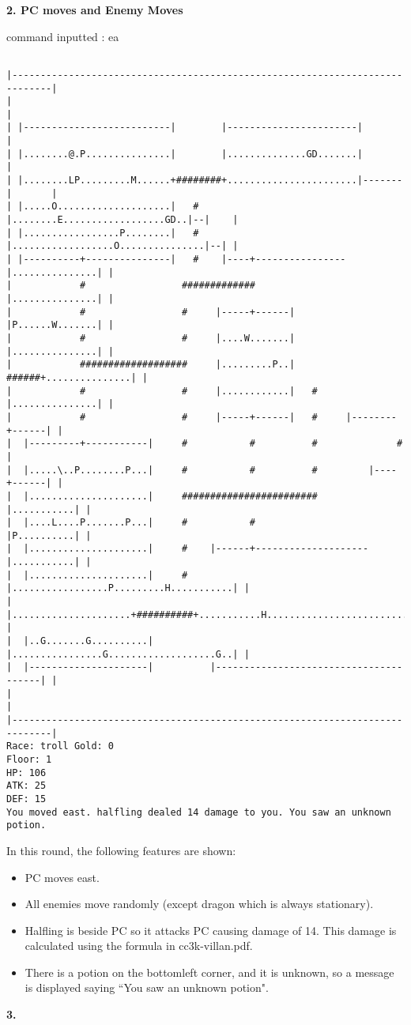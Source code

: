 \documentclass[11pt]{article}
\theoremstyle{plain}
\begin{document}
\newpage
\textbf{2. PC moves and Enemy Moves}

command inputted : ea
\begin{Verbatim}[fontsize=\small]

|-----------------------------------------------------------------------------|
|                                                                             |
| |--------------------------|        |-----------------------|               |
| |........@.P...............|        |..............GD.......|               |
| |........LP.........M......+########+.......................|-------|       |
| |.....O....................|   #    |........E..................GD..|--|    |
| |.................P........|   #    |..................O...............|--| |
| |----------+---------------|   #    |----+----------------|...............| |
|            #                 #############                |...............| |
|            #                 #     |-----+------|         |P......W.......| |
|            #                 #     |....W.......|         |...............| |
|            ###################     |.........P..|   ######+...............| |
|            #                 #     |............|   #     |...............| |
|            #                 #     |-----+------|   #     |--------+------| |
|  |---------+-----------|     #           #          #              #        |
|  |.....\..P........P...|     #           #          #         |----+------| |
|  |.....................|     ########################         |...........| |
|  |....L....P.......P...|     #           #                    |P..........| |
|  |.....................|     #    |------+--------------------|...........| |
|  |.....................|     #    |.................P.........H...........| |
|  |.....................+##########+...........H...........................| |
|  |..G.......G..........|          |................G...................G..| |
|  |---------------------|          |---------------------------------------| |
|                                                                             |
|-----------------------------------------------------------------------------|
Race: troll Gold: 0                                                    Floor: 1
HP: 106
ATK: 25
DEF: 15
You moved east. halfling dealed 14 damage to you. You saw an unknown potion. 
\end{Verbatim}

In this round, the following features are shown:
\begin{itemize}
	\item PC moves east.
	\item All enemies move randomly (except dragon which is always stationary).
	\item Halfling is beside PC so it attacks PC causing damage of 14.
		This damage is calculated using the formula in cc3k-villan.pdf.
	\item There is a potion on the bottomleft corner, and it is unknown, so a 
		message is displayed saying ``You saw an unknown potion". 
\end{itemize}


\vspace{1.0 in}
\textbf{3. }
\end{document}
